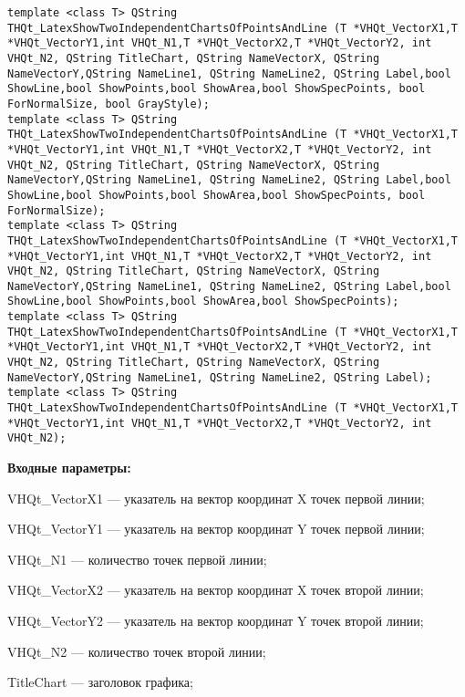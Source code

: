 \documentclass[a4paper,12pt]{article}
\begin{document}
\begin{lstlisting}[label=code_syntax_THQt_LatexShowTwoIndependentChartsOfPointsAndLine,caption=Синтаксис]
template <class T> QString THQt_LatexShowTwoIndependentChartsOfPointsAndLine (T *VHQt_VectorX1,T *VHQt_VectorY1,int VHQt_N1,T *VHQt_VectorX2,T *VHQt_VectorY2, int VHQt_N2, QString TitleChart, QString NameVectorX, QString NameVectorY,QString NameLine1, QString NameLine2, QString Label,bool ShowLine,bool ShowPoints,bool ShowArea,bool ShowSpecPoints, bool ForNormalSize, bool GrayStyle);
template <class T> QString THQt_LatexShowTwoIndependentChartsOfPointsAndLine (T *VHQt_VectorX1,T *VHQt_VectorY1,int VHQt_N1,T *VHQt_VectorX2,T *VHQt_VectorY2, int VHQt_N2, QString TitleChart, QString NameVectorX, QString NameVectorY,QString NameLine1, QString NameLine2, QString Label,bool ShowLine,bool ShowPoints,bool ShowArea,bool ShowSpecPoints, bool ForNormalSize);
template <class T> QString THQt_LatexShowTwoIndependentChartsOfPointsAndLine (T *VHQt_VectorX1,T *VHQt_VectorY1,int VHQt_N1,T *VHQt_VectorX2,T *VHQt_VectorY2, int VHQt_N2, QString TitleChart, QString NameVectorX, QString NameVectorY,QString NameLine1, QString NameLine2, QString Label,bool ShowLine,bool ShowPoints,bool ShowArea,bool ShowSpecPoints);
template <class T> QString THQt_LatexShowTwoIndependentChartsOfPointsAndLine (T *VHQt_VectorX1,T *VHQt_VectorY1,int VHQt_N1,T *VHQt_VectorX2,T *VHQt_VectorY2, int VHQt_N2, QString TitleChart, QString NameVectorX, QString NameVectorY,QString NameLine1, QString NameLine2, QString Label);
template <class T> QString THQt_LatexShowTwoIndependentChartsOfPointsAndLine (T *VHQt_VectorX1,T *VHQt_VectorY1,int VHQt_N1,T *VHQt_VectorX2,T *VHQt_VectorY2, int VHQt_N2);
\end{lstlisting}

\textbf{Входные параметры:}
 
    VHQt\_VectorX1 --- указатель на вектор координат X точек первой линии;
 
    VHQt\_VectorY1 --- указатель на вектор координат Y точек первой линии;
 
    VHQt\_N1 --- количество точек первой линии;
 
    VHQt\_VectorX2 --- указатель на вектор координат X точек второй линии;
 
    VHQt\_VectorY2 --- указатель на вектор координат Y точек второй линии;
 
    VHQt\_N2 --- количество точек второй линии;
 
    TitleChart --- заголовок графика;
 
\end{document}
